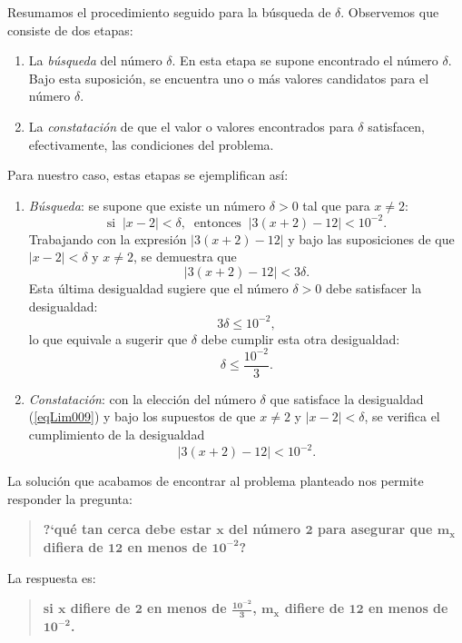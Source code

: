 Resumamos el procedimiento seguido para la búsqueda de $\delta$. Observemos que consiste de dos
etapas: {\label{eqLim017}\begin{enumerate}
\item La \textit{búsqueda} del número $\delta$. En esta etapa se supone encontrado el número
    $\delta$. Bajo esta suposición, se encuentra uno o más valores candidatos para el número
    $\delta$.
\item La \textit{constatación} de que el valor o valores encontrados para $\delta$ satisfacen,
    efectivamente, las condiciones del problema.
\end{enumerate}}

Para nuestro caso, estas etapas se ejemplifican así:
\begin{enumerate}
\item \textit{Búsqueda}: se supone que existe un número $\delta > 0$ tal que para $x\neq 2$:
\[
\text{si } \ |x - 2| < \delta, \ \text{ entonces } \ |3(x + 2) - 12| < 10^{-2}.
\]
Trabajando con la expresión $|3(x + 2) - 12|$ y bajo las suposiciones de que $|x - 2| < \delta$
y $x\neq 2$, se demuestra que
\[
|3(x + 2) - 12| < 3\delta.
\]
Esta última desigualdad sugiere que el número $\delta > 0$ debe satisfacer la desigualdad:
\[
3\delta \leq 10^{-2},
\]
lo que equivale a sugerir que $\delta$ debe cumplir esta otra desigualdad:
\begin{equation}
\label{eqLim009}%
\delta \leq \frac{10^{-2}}{3}.
\end{equation}

\item \textit{Constatación}: con la elección del número $\delta$ que satisface la desigualdad
    (\ref{eqLim009}) y bajo los supuestos de que $x\neq 2$ y $|x - 2| < \delta$, se verifica el
    cumplimiento de la desigualdad
\[
|3(x + 2) - 12| < 10^{-2}.
\]
\end{enumerate}

La solución que acabamos de encontrar al problema planteado nos permite responder la pregunta:
\begin{quote}
{\bfseries ?`qué tan cerca debe estar $\bm{x}$ del número $\bm{2}$ para asegurar que $\bm{m_x}$
difiera de $\bm{12}$ en menos de $\bm{10^{-2}}$?}
\end{quote}
La respuesta es:
\begin{quote}
{\bfseries si $\bm{x}$ difiere de $\bm{2}$ en menos de $\bm{\displaystyle{\frac{10^{-2}}{3}}}$,
$\bm{m_x}$ difiere de $\bm{12}$ en menos de $\bm{10^{-2}}$.}
\end{quote}

